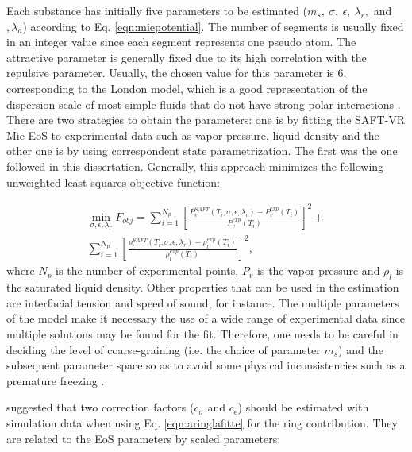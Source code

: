 Each substance has initially five parameters to be estimated ($m_s,\ \sigma,\ \epsilon,\ \lambda_{r},$ and $, \lambda_{a}$) according to Eq. \eqref{eqn:miepotential}. The number of segments is usually fixed in an integer value since each segment represents one pseudo atom. The attractive parameter is generally  fixed due to its  high correlation with the repulsive parameter. Usually, the chosen value for this parameter is 6, corresponding to the London model, which is a good representation of the dispersion scale of most simple fluids that do not have strong polar interactions \cite{ramrattan2015,herdes2015}. There are two strategies to obtain the parameters: one is by fitting the SAFT-VR Mie EoS to experimental data such as vapor pressure, liquid density and the other one is by using correspondent state parametrization. The first was the one followed in this dissertation. Generally, this approach minimizes the following unweighted least-squares objective function:

\begin{equation}
\begin{aligned}
\min\limits_{\sigma,\epsilon,\lambda_{r}} F_{obj}= \sum_{i=1}^{N_{p}} \left[\frac{P_{v}^{SAFT}(T_{i},\sigma,\epsilon,\lambda_{r})-P_{v}^{exp}(T_{i})}{P_{v}^{exp}(T_{i})} \right]^2 +\\
\sum_{i=1}^{N_{p}} \left[\frac{\rho_{l}^{SAFT}(T_{i},\sigma,\epsilon,\lambda_{r})-\rho_{l}^{exp}(T_{i})}{\rho_{l}^{exp}(T_{i})} \right]^2 ,
\end{aligned}
\label{eqn:fobj}
\end{equation}
where $N_{p}$ is the number of experimental points, $P_{v}$ is the vapor pressure and $\rho_{l}$ is the saturated liquid density. Other properties that can be used in the estimation are interfacial tension and speed of sound, for instance. The multiple parameters of the model make it necessary the use of a wide range of experimental data since multiple solutions may be found for the fit. Therefore, one needs to be careful in deciding the level of coarse-graining (i.e. the choice of parameter $m_{s}$) and the subsequent parameter space so as to avoid some physical inconsistencies such as a premature freezing \cite{lobanova2015}.

 suggested that two correction factors ($c_{\sigma}$ and $c_{\epsilon}$) should be estimated with simulation data when using Eq. \eqref{eqn:aringlafitte} for the ring contribution. They are related to the EoS parameters by scaled parameters:

